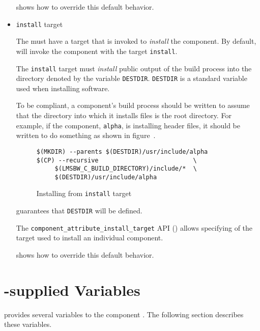 \begin{itemize}
   shows how to override this
  default behavior.

\item \texttt{install} target

  The \makefile must have a target that is invoked to \emph{install}
  the component.  By default, \lmsbw will invoke the component
  \makefile with the target \texttt{install}.

  The \texttt{install} target must \emph{install} public output of the
  build process into the directory denoted by the \makefile variable
  \texttt{DESTDIR}.  \texttt{DESTDIR} is a standard \make variable
  used when installing software.

  To be compliant, a component's build process should be written to
  assume that the directory into which it installs files is the root
  directory.  For example, if the component, \texttt{alpha}, is
  installing header files, it should be written to do something as
  shown in figure~.

\begin{figure}
\hrulefill
\begin{verbatim}
$(MKDIR) --parents $(DESTDIR)/usr/include/alpha
$(CP) --recursive                          \
     $(LMSBW_C_BUILD_DIRECTORY)/include/*  \
     $(DESTDIR)/usr/include/alpha
\end{verbatim}
\hrulefill
\caption{Installing from \texttt{install} target}\label{wrap:install-target}
\end{figure}

  \lmsbw guarantees that \texttt{DESTDIR} will be defined.

  The \texttt{component\_attribute\_install\_target} API
  () allows specifying of
  the target used to install an individual component.

   shows how to override this
  default behavior.

\end{itemize}

\section{\lmsbw-supplied Variables}

\lmsbw provides several variables to the component \makefile.  The
following section describes these variables.

\subsection{\destdir}

